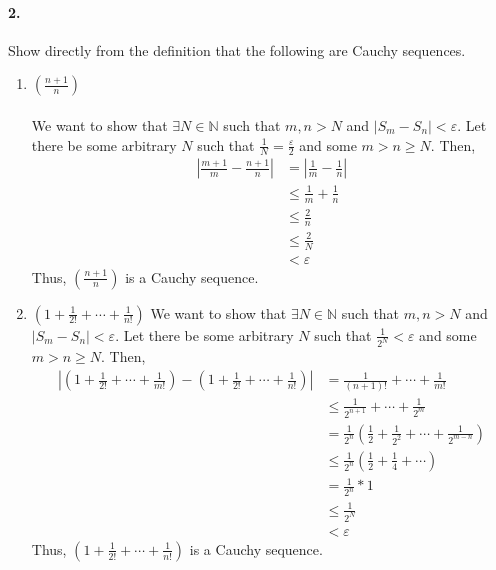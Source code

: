 \documentclass[12pt]{article}
\newcommand\N{\mathbb{N}}
\theoremstyle{remark}
\begin{document}
\paragraph{2.} Show directly from the definition that the following are Cauchy sequences.
\begin{enumerate}[label=(\alph*)]
    \item $(\frac{n + 1}{n})$ \\\null\\
    We want to show that $\exists N \in \N$ such that $m, n > N$ and $|S_m - S_n| < \varepsilon$. Let there be some arbitrary $N$ such that $\frac{1}{N} = \frac{\varepsilon}{2}$ and some $m > n \geq N$. Then,
    \begin{align*}
        \left\lvert\frac{m + 1}{m} - \frac{n + 1}{n}\right\rvert &= \left\lvert\frac{1}{m} - \frac{1}{n}\right\rvert \\
        &\leq \frac{1}{m} + \frac{1}{n} \\
        &\leq \frac{2}{n} \\
        &\leq \frac{2}{N} \\
        &< \varepsilon
    \end{align*}
    Thus, $(\frac{n + 1}{n})$ is a Cauchy sequence.

    \item $(1 + \frac{1}{2!} + \cdots + \frac{1}{n!})$
    We want to show that $\exists N \in \N$ such that $m, n > N$ and $|S_m - S_n| < \varepsilon$. Let there be some arbitrary $N$ such that $\frac{1}{2^N} < \varepsilon$ and some $m > n \geq N$. Then,
    \begin{align*}
        \left\lvert\left(1 + \frac{1}{2!} + \cdots + \frac{1}{m!}\right) - \left(1 + \frac{1}{2!} + \cdots + \frac{1}{n!}\right)\right\rvert &= \frac{1}{(n + 1)!} + \cdots + \frac{1}{m!} \\
        &\leq \frac{1}{2^{n + 1}} + \cdots + \frac{1}{2^m} \\
        &= \frac{1}{2^n} \left(\frac{1}{2} + \frac{1}{2^2} + \cdots + \frac{1}{2^{m - n}}\right) \\
        &\leq \frac{1}{2^n} \left(\frac{1}{2} + \frac{1}{4} + \cdots\right) \\
        &= \frac{1}{2^n} * 1 \\
        &\leq \frac{1}{2^N} \\
        &< \varepsilon
    \end{align*}
    Thus, $(1 + \frac{1}{2!} + \cdots + \frac{1}{n!})$ is a Cauchy sequence.
\end{enumerate}
\end{document}
